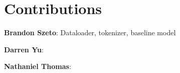 \section*{Contributions}

\textbf{Brandon Szeto}: Dataloader, tokenizer, baseline model

\textbf{Darren Yu}:

\textbf{Nathaniel Thomas}:
